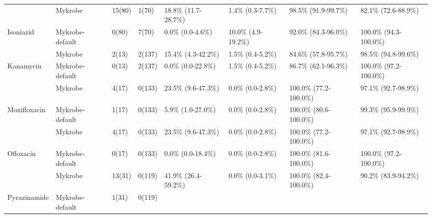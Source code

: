 \begin{table}
{\begin{tabular}{|l|l|l|l|l|l|l|l|}
 &
  Mykrobe &
  15(80) &
  1(70) &
  18.8\% (11.7-28.7\%) &
  1.4\% (0.3-7.7\%) &
  98.5\% (91.9-99.7\%) &
  82.1\% (72.6-88.9\%) \\ \cline{2-8} 
\multirow{-2}{*}{Isoniazid} &
  \cellcolor[HTML]{EFEFEF}Mykrobe-default &
  \cellcolor[HTML]{EFEFEF}0(80) &
  \cellcolor[HTML]{EFEFEF}7(70) &
  \cellcolor[HTML]{EFEFEF}0.0\% (0.0-4.6\%) &
  \cellcolor[HTML]{EFEFEF}10.0\% (4.9-19.2\%) &
  \cellcolor[HTML]{EFEFEF}92.0\% (84.3-96.0\%) &
  \cellcolor[HTML]{EFEFEF}100.0\% (94.3-100.0\%) \\ \hline
 &
  Mykrobe &
  2(13) &
  2(137) &
  15.4\% (4.3-42.2\%) &
  1.5\% (0.4-5.2\%) &
  84.6\% (57.8-95.7\%) &
  98.5\% (94.8-99.6\%) \\ \cline{2-8} 
\multirow{-2}{*}{Kanamycin} &
  \cellcolor[HTML]{EFEFEF}Mykrobe-default &
  \cellcolor[HTML]{EFEFEF}0(13) &
  \cellcolor[HTML]{EFEFEF}2(137) &
  \cellcolor[HTML]{EFEFEF}0.0\% (0.0-22.8\%) &
  \cellcolor[HTML]{EFEFEF}1.5\% (0.4-5.2\%) &
  \cellcolor[HTML]{EFEFEF}86.7\% (62.1-96.3\%) &
  \cellcolor[HTML]{EFEFEF}100.0\% (97.2-100.0\%) \\ \hline
 &
  Mykrobe &
  4(17) &
  0(133) &
  23.5\% (9.6-47.3\%) &
  0.0\% (0.0-2.8\%) &
  100.0\% (77.2-100.0\%) &
  97.1\% (92.7-98.9\%) \\ \cline{2-8} 
\multirow{-2}{*}{Moxifloxacin} &
  \cellcolor[HTML]{EFEFEF}Mykrobe-default &
  \cellcolor[HTML]{EFEFEF}1(17) &
  \cellcolor[HTML]{EFEFEF}0(133) &
  \cellcolor[HTML]{EFEFEF}5.9\% (1.0-27.0\%) &
  \cellcolor[HTML]{EFEFEF}0.0\% (0.0-2.8\%) &
  \cellcolor[HTML]{EFEFEF}100.0\% (80.6-100.0\%) &
  \cellcolor[HTML]{EFEFEF}99.3\% (95.9-99.9\%) \\ \hline
 &
  Mykrobe &
  4(17) &
  0(133) &
  23.5\% (9.6-47.3\%) &
  0.0\% (0.0-2.8\%) &
  100.0\% (77.2-100.0\%) &
  97.1\% (92.7-98.9\%) \\ \cline{2-8} 
\multirow{-2}{*}{Ofloxacin} &
  \cellcolor[HTML]{EFEFEF}Mykrobe-default &
  \cellcolor[HTML]{EFEFEF}0(17) &
  \cellcolor[HTML]{EFEFEF}0(133) &
  \cellcolor[HTML]{EFEFEF}0.0\% (0.0-18.4\%) &
  \cellcolor[HTML]{EFEFEF}0.0\% (0.0-2.8\%) &
  \cellcolor[HTML]{EFEFEF}100.0\% (81.6-100.0\%) &
  \cellcolor[HTML]{EFEFEF}100.0\% (97.2-100.0\%) \\ \hline
 &
  Mykrobe &
  13(31) &
  0(119) &
  41.9\% (26.4-59.2\%) &
  0.0\% (0.0-3.1\%) &
  100.0\% (82.4-100.0\%) &
  90.2\% (83.9-94.2\%) \\ \cline{2-8} 
\multirow{-2}{*}{Pyrazinamide} &
  \cellcolor[HTML]{EFEFEF}Mykrobe-default &
  \cellcolor[HTML]{EFEFEF}1(31) &
  \cellcolor[HTML]{EFEFEF}0(119) &

\end{tabular}}
\end{table}
